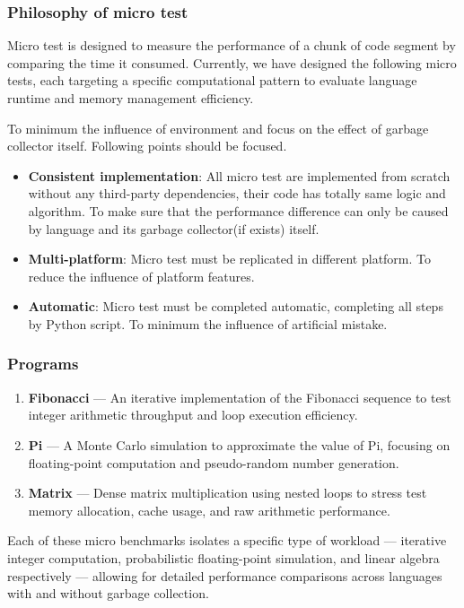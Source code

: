 \subsubsection{Philosophy of micro test}
Micro test is designed to measure the performance of a chunk of code segment by comparing the time it consumed. Currently, we have designed the following micro tests, each targeting a specific computational pattern to evaluate language runtime and memory management efficiency.

To minimum the influence of environment and focus on the effect of garbage collector itself. Following points should be focused.

\begin{itemize}
    \item \textbf{Consistent implementation}: All micro test are implemented from scratch without any third-party dependencies, their code has totally same logic and algorithm. To make sure that the performance difference can only be caused by language and its garbage collector(if exists) itself.
    \item \textbf{Multi-platform}: Micro test must be replicated in different platform. To reduce the influence of platform features.
    \item \textbf{Automatic}: Micro test must be completed automatic, completing all steps by Python script. To minimum the influence of artificial mistake.
\end{itemize}


\subsubsection{Programs}
\begin{enumerate}
  \item \textbf{Fibonacci} — An iterative implementation of the Fibonacci sequence to test integer arithmetic throughput and loop execution efficiency.
  \item \textbf{Pi} — A Monte Carlo simulation to approximate the value of Pi, focusing on floating-point computation and pseudo-random number generation.
  \item \textbf{Matrix} — Dense matrix multiplication using nested loops to stress test memory allocation, cache usage, and raw arithmetic performance.
\end{enumerate}

Each of these micro benchmarks isolates a specific type of workload — iterative integer computation, probabilistic floating-point simulation, and linear algebra respectively — allowing for detailed performance comparisons across languages with and without garbage collection.


